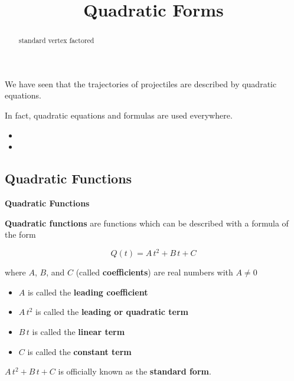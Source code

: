 \documentclass{ximera}
\title{Quadratic Forms}
\begin{document}
\begin{abstract}
standard vertex factored
\end{abstract}
\maketitle



We have seen that the trajectories of projectiles are described by quadratic equations.  

In fact, quadratic equations and formulas are used everywhere.


\begin{itemize}
\item {}
\item {}
\end{itemize}







\subsection*{Quadratic Functions}


\begin{definition} \textbf{\textcolor{green!50!black}{Quadratic Functions}} 

\textbf{Quadratic functions} are functions which can be described with a formula of the form

\[  Q(t) = A \, t^2 + B \, t + C  \]

where $A$, $B$, and $C$ (called \textbf{coefficients}) are real numbers with $A \ne 0$



\begin{itemize}
\item $A$ is called the \textbf{leading coefficient} 
\item $A \, t^2$ is called the \textbf{leading or quadratic term} 
\item $B \, t$ is called the \textbf{linear term} 
\item $C$ is called the \textbf{constant term} 
\end{itemize}


$A \, t^2 + B \, t + C $ is officially known as the \textbf{standard form}.

\end{definition}
\end{document}
